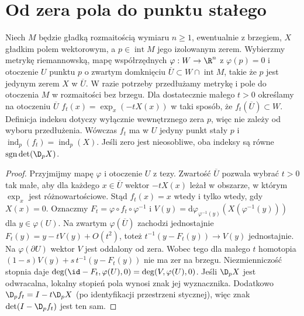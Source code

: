 \section{Od zera pola do punktu stałego}
\begin{lemat}
\label{lem:field-fixed-v11}
Niech $M$ będzie gładką rozmaitością wymiaru $n\ge1$,
ewentualnie z brzegiem, $X$ gładkim polem wektorowym,
a $p\in\operatorname{int}M$ jego izolowanym zerem.
Wybierzmy metrykę riemannowską, mapę współrzędnych
$\varphi:W\to\R^n$ z $\varphi(p)=0$
i otoczenie $U$ punktu $p$ o zwartym domknięciu
$\overline U\subset W\cap\operatorname{int}M$, takie że
$p$ jest jedynym zerem $X$ w $\overline U$.
W razie potrzeby przedłużamy metrykę i pole do otoczenia
$M$ w rozmaitości bez brzegu. Dla dostatecznie małego $t>0$
określamy na otoczeniu $\overline U$
$f_t(x)=\exp_x(-tX(x))$ w taki sposób, że
$f_t(\overline U)\subset W$.
Definicja indeksu dotyczy wyłącznie wewnętrznego
zera $p$, więc nie zależy od wyboru przedłużenia.
Wówczas $f_t$ ma w $U$ jedyny punkt stały $p$ i
$\operatorname{ind}_p(f_t)=\operatorname{ind}_p(X)$.
Jeśli zero jest nieosobliwe, oba indeksy są równe
$\operatorname{sgn}\det(\D_pX)$.
\end{lemat}
\begin{proof}
Przyjmijmy mapę $\varphi$ i otoczenie $U$ z tezy.
Zwartość $\overline U$ pozwala wybrać $t>0$ tak małe,
aby dla każdego $x\in\overline U$ wektor $-tX(x)$ leżał
w obszarze, w którym $\exp_x$ jest różnowartościowe.
Stąd $f_t(x)=x$ wtedy i tylko wtedy, gdy $X(x)=0$.
Oznaczmy $F_t=\varphi\circ f_t\circ\varphi^{-1}$ i
$V(y)=\mathrm d\varphi_{\varphi^{-1}(y)}
  (X(\varphi^{-1}(y)))$ dla $y\in\varphi(U)$.
Na zwartym $\varphi(\overline U)$ zachodzi jednostajnie
$F_t(y)=y-tV(y)+O(t^2)$, toteż
$t^{-1}(y-F_t(y))\to V(y)$ jednostajnie.
Na $\varphi(\partial U)$ wektor $V$ jest oddalony od zera.
Wobec tego dla małego $t$ homotopia
$(1-s)V(y)+s\,t^{-1}(y-F_t(y))$ nie ma zer na brzegu.
Niezmienniczość stopnia daje
$\deg(\id-F_t,\varphi(U),0)=\deg(V,\varphi(U),0)$.
Jeśli $\D_pX$ jest odwracalna, lokalny stopień pola
wynosi znak jej wyznacznika. Dodatkowo
$\D_pf_t=I-t\D_pX$ (po identyfikacji przestrzeni stycznej),
więc znak $\det(I-\D_pf_t)$ jest ten sam.
\end{proof}

